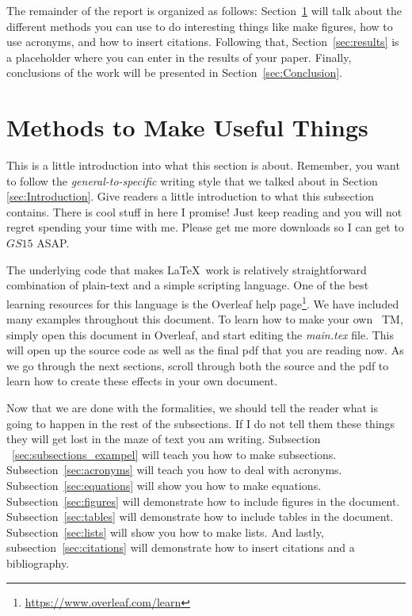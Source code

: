 \documentclass[]{NASA}
\begin{document}
\begin{flushleft}
The remainder of the report is organized as follows: 
Section~\ref{sec:methods} will talk about the different methods you can use to do interesting things like make figures, how to use acronyms, and how to insert citations.
Following that, Section~\ref{sec:results} is a placeholder where you can enter in the results of your paper.
Finally, conclusions of the work will be presented in Section~\ref{sec:Conclusion}.


\section{Methods to Make Useful Things} 
\label{sec:methods} 
This is a little introduction into what this section is about. Remember, you want to follow the \emph{general-to-specific} writing style that we talked about in Section \ref{sec:Introduction}. Give readers a little introduction to what this subsection contains. There is cool stuff in here I promise! Just keep reading and you will not regret spending your time with me. Please get me more downloads so I can get to $GS15$ \ac{ASAP}.

The underlying code that makes \LaTeX ~work is relatively straightforward combination of plain-text and a simple scripting language. One of the best learning resources for this language is the Overleaf help page\footnote{\url{https://www.overleaf.com/learn}}. We have included many examples throughout this document. To learn how to make your own ~\ac{TM}, simply open this document in Overleaf, and start editing the \emph{main.tex} file. 
This will open up the source code as well as the final pdf that you are reading now.
As we go through the next sections, scroll through both the source and the pdf to learn how to create these effects in your own document. 

Now that we are done with the formalities, we should tell the reader what is going to happen in the rest of the subsections. If I do not tell them these things they will get lost in the maze of text you am writing.
Subsection ~\ref{sec:subsections_exampel} will teach you how to make subsections. Subsection~\ref{sec:acronyms} will teach you how to deal with acronyms. Subsection~\ref{sec:equations} will show you how to make equations.
Subsection~\ref{sec:figures} will demonstrate how to include figures in the document.
Subsection~\ref{sec:tables} will demonstrate how to include tables in the document.
Subsection~\ref{sec:lists} will show you how to make lists.
And lastly, subsection~\ref{sec:citations} will demonstrate how to insert citations and a bibliography.


\end{flushleft}
\end{document}
